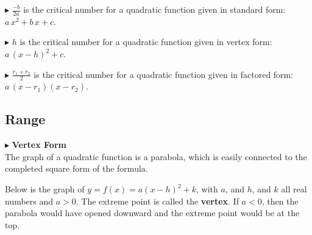 \documentclass{ximera}
\begin{document}
\textbf{\textcolor{blue!55!black}{$\blacktriangleright$}}  $\frac{-b}{2a}$ is the critical number for a quadratic function given in standard form: $a \, x^2 + b \, x + c$.



\textbf{\textcolor{blue!55!black}{$\blacktriangleright$}}  $h$ is the critical number for a quadratic function given in vertex form: $a \, (x - h)^2 + c$.



\textbf{\textcolor{blue!55!black}{$\blacktriangleright$}}  $\frac{r_1 + r_2}{2}$ is the critical number for a quadratic function given in factored form: $a \, (x - r_1) (x - r_2)$.

















\subsection*{Range}

$\blacktriangleright$  \textbf{Vertex Form} \\

The graph of a quadratic function is a parabola, which is easily connected to the completed square form of the formula.

Below is the graph of $y = f(x) = a (x - h)^2 + k$, with $a$, and $h$, and $k$ all real numbers and $a > 0$. The extreme point is called the \textbf{vertex}. If $a<0$, then the parabola would have opened downward and the extreme point would be at the top.

\begin{image}
\end{image}
\end{document}
